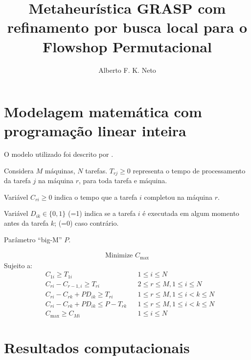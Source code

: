 \documentclass[12pt]{article}
\title{Metaheurística GRASP com refinamento por busca local para o Flowshop Permutacional}
\author{Alberto F. K. Neto\inst{1}}
\begin{document}
 

\maketitle

\section{Modelagem matemática com programação linear inteira}

O modelo utilizado foi descrito por \cite{tseng2004-flowshop-models}.

Considera $M$ máquinas, $N$ tarefas. $T_{rj} \geqslant 0$ representa o tempo de processamento
da tarefa $j$ na máquina $r$, para toda tarefa e máquina.

Variável $C_{ri} \geqslant 0$ indica o tempo que a tarefa $i$ completou na máquina $r$.

Variável $D_{ik} \in \{0,1\}$ (=1) indica se a tarefa $i$ é executada em algum momento antes da
tarefa $k$; (=0) caso contrário.

Parâmetro ``big-M'' $P$.

\begin{align}
   \text{Minimize } C_\mathrm{max}
\end{align}
Sujeito a:
\begin{align}
   & C_{1i} \geqslant T_{1i} & & 1 \leqslant i \leqslant N\\
   & C_{ri} - C_{r-1,i} \geqslant T_{ri} & & 2 \leqslant r \leqslant M, 
      1 \leqslant i \leqslant N\\
   & C_{ri} - C_{rk} + PD_{ik} \geqslant T_{ri} & & 1 \leqslant r \leqslant M, 
      1 \leqslant i < k \leqslant N\\
   & C_{ri} - C_{rk} + PD_{ik} \leqslant P - T_{rk} & & 1 \leqslant r \leqslant M, 
      1 \leqslant i < k \leqslant N\\
   & C_\mathrm{max} \geqslant C_{Mi} & & 1 \leqslant i \leqslant N
\end{align}


\section{Resultados computacionais}

\tiny

\normalsize
\end{document}
